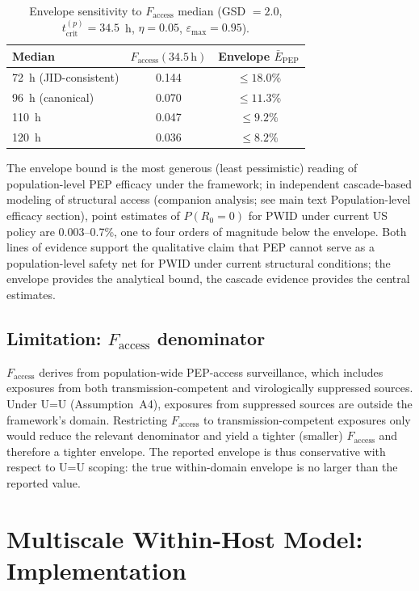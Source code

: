 \documentclass[11pt]{article}
\theoremstyle{definition}
\theoremstyle{remark}
\newcommand{\Ebarpep}{\bar{E}_{\text{PEP}}}
\newcommand{\Faccess}{F_{\text{access}}}
\newcommand{\tcrit}{t_{\text{crit}}}
\newcommand{\emax}{\varepsilon_{\max}}
\begin{document}
\begin{table}[H]
\centering
\small
\caption{Envelope sensitivity to $\Faccess$ median (GSD $= 2.0$, $\tcrit^{(p)} = 34.5$~h, $\eta = 0.05$, $\emax = 0.95$).}
\begin{tabular}{@{}lcc@{}}
\toprule
\textbf{Median} & \textbf{$\Faccess(34.5\,\text{h})$} & \textbf{Envelope $\Ebarpep$} \\
\midrule
72~h (JID-consistent) & 0.144 & $\leq 18.0\%$ \\
96~h (canonical)      & 0.070 & $\leq 11.3\%$ \\
110~h                 & 0.047 & $\leq 9.2\%$  \\
120~h                 & 0.036 & $\leq 8.2\%$  \\
\bottomrule
\end{tabular}
\end{table}

The envelope bound is the most generous (least pessimistic) reading of population-level PEP efficacy under the framework; in independent cascade-based modeling of structural access (companion analysis; see main text Population-level efficacy section), point estimates of $P(R_{0}=0)$ for PWID under current US policy are 0.003--0.7\%, one to four orders of magnitude below the envelope. Both lines of evidence support the qualitative claim that PEP cannot serve as a population-level safety net for PWID under current structural conditions; the envelope provides the analytical bound, the cascade evidence provides the central estimates.

\subsection{Limitation: \texorpdfstring{$\Faccess$}{Faccess} denominator}

$\Faccess$ derives from population-wide PEP-access surveillance, which includes exposures from both transmission-competent and virologically suppressed sources. Under U=U (Assumption~A4), exposures from suppressed sources are outside the framework's domain. Restricting $\Faccess$ to transmission-competent exposures only would reduce the relevant denominator and yield a tighter (smaller) $\Faccess$ and therefore a tighter envelope. The reported envelope is thus conservative with respect to U=U scoping: the true within-domain envelope is no larger than the reported value.


\section{Multiscale Within-Host Model: Implementation}
\end{document}
